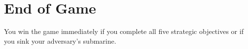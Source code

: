 \section*{End of Game}
You win the game immediately if you complete all five strategic objectives or if you sink your adversary's submarine. 
